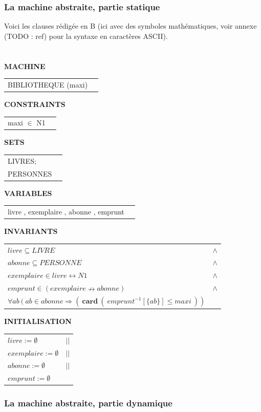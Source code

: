 \documentclass[10pt,a4paper]{article}
\begin{document}
\subsubsection{La machine abstraite, partie statique}

Voici les clauses rédigée en B (ici avec des symboles mathématiques, voir annexe (TODO : ref) pour la syntaxe en caractères ASCII).
\\
\\
\\
\setlength{\LTpre}{\medskipamount} %
\setlength{\LTpost}{0pt}
\setlength\LTleft{\parindent}
\textbf{MACHINE}
\begin{longtable}{ll} BIBLIOTHEQUE (maxi) \end{longtable}
\noindent\textbf{CONSTRAINTS}
\begin{longtable}{ll} maxi $\in$ N1 \end{longtable}
\noindent\textbf{SETS}
\begin{longtable}{ll} LIVRES; \\ PERSONNES\\ \end{longtable}
\noindent\textbf{VARIABLES}
\begin{longtable}{ll} livre , exemplaire , abonne , emprunt \end{longtable}
\noindent\textbf{INVARIANTS}
\begin{longtable}{ll}
$livre \subseteq LIVRE $ & $\wedge$ \tabularnewline
$abonne \subseteq PERSONNE$ & $\wedge$ \tabularnewline
$exemplaire \in livre \leftrightarrow N1$ & $\wedge$ \tabularnewline
$emprunt \in ( exemplaire \nrightarrow abonne )$ & $\wedge$ \tabularnewline
$\forall ab\ (\ ab \in abonne \Rightarrow (\ \textbf{card}\ (\ emprunt ^{-1}[\{ab\}] \leq maxi\ ))$ &
\end{longtable}
\noindent\textbf{INITIALISATION}
\begin{longtable}{ll}
$livre := \emptyset$ & $||$ \tabularnewline
$exemplaire := \emptyset$ & $||$ \tabularnewline
$abonne := \emptyset$ & $||$ \tabularnewline
$emprunt := \emptyset$ &
\end{longtable}

\subsubsection{La machine abstraite, partie dynamique}
\end{document}
